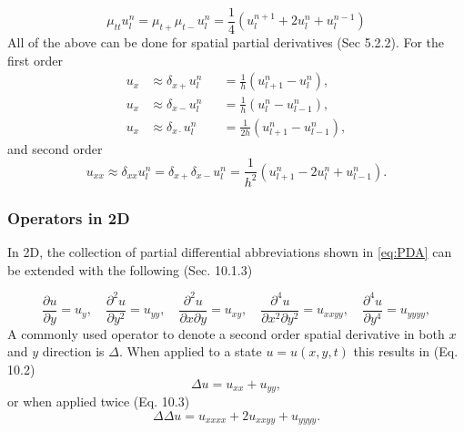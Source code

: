 \documentclass{article}
\begin{document}
\begin{equation}
    \mu_{tt} u_l^n = \mu_{t+}\mu_{t-}u_l^n = \frac{1}{4}(u_l^{n+1}+2u_l^n+u_l^{n-1})
\end{equation}
All of the above can be done for spatial partial derivatives (Sec 5.2.2). For the first order 
\begin{subequations}\label{eq:firstOrderSpace}
\begin{alignat}{2}
    u_x &\approx \delta_{x+}u_l^n &&= \frac{1}{h} (u_{l+1}^n - u_l^n),\\
    u_x &\approx \delta_{x-}u_l^n &&= \frac{1}{h} (u_l^n - u_{l-1}^n),\\
    u_x &\approx \delta_{x\cdot}u_l^n &&= \frac{1}{2h} (u_{l+1}^n - u_{l-1}^n),
\end{alignat}
\end{subequations}
and second order 
\begin{equation}\label{eq:secondOrderSpace}
    u_{xx} \approx \delta_{xx}u_l^n = \delta_{x+}\delta_{x-}u_l^n = \frac{1}{h^2} (u_{l+1}^n - 2u_l^n + u_{l-1}^n).
\end{equation}

\subsubsection{Operators in 2D}
In 2D, the collection of partial differential abbreviations shown in \eqref{eq:PDA} can be extended with the following (Sec. 10.1.3)

\begin{equation}
    \frac{\partial u}{\partial y} = u_{y}, \quad \frac{\partial^2 u}{\partial y^2} = u_{yy}, \quad
    \frac{\partial^2 u}{\partial x\partial y} = u_{xy}, \quad
    \frac{\partial^4 u}{\partial x^2\partial y^2} = u_{xxyy}, \quad
    \frac{\partial^4 u}{\partial y^4} = u_{yyyy},
\end{equation}
A commonly used operator to denote a second order spatial derivative in both $x$ and $y$ direction is $\Delta$. When applied to a state $u=u(x,y,t)$ this results in (Eq. 10.2)
\begin{equation}
    \Delta u = u_{xx} + u_{yy},
\end{equation}
or when applied twice (Eq. 10.3) \begin{equation}
    \Delta\Delta u = u_{xxxx} + 2u_{xxyy} + u_{yyyy}.
\end{equation}
\end{document}
